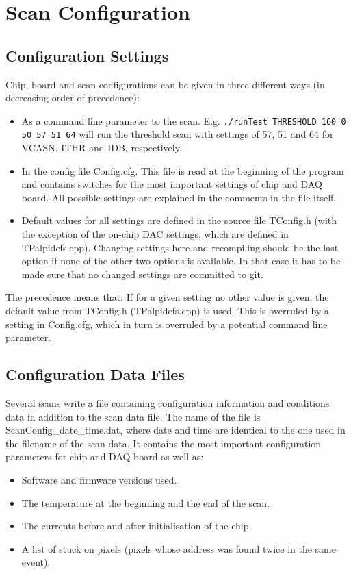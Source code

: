 \documentclass{article}
\let\oldsection\section
\renewcommand\section{\clearpage\oldsection}
\begin{document}
\section{Scan Configuration}

\subsection{Configuration Settings}

Chip, board and scan configurations can be given in three different ways (in decreasing order of precedence): 

\begin{itemize}
\item As a command line parameter to the scan. E.g. \texttt{./runTest THRESHOLD 160 0 50 57 51 64} will run the threshold scan with settings of 57, 51 and 64 for VCASN, ITHR and IDB, respectively.
\item In the config file Config.cfg. This file is read at the beginning of the program and contains switches for the most important settings of chip and DAQ board. All possible settings are explained in the comments in the file itself.
\item Default values for all settings are defined in the source file TConfig.h (with the exception of the on-chip DAC settings, which are defined in TPalpidefs.cpp). Changing settings here and recompiling should be the last option if none of the other two options is available. In that case it has to be made sure that no changed settings are committed to git.
\end{itemize}

The precedence means that: If for a given setting no other value is given, the default value from TConfig.h (TPalpidefs.cpp) is used. This is overruled by a setting in Config.cfg, which in turn is overruled by a potential command line parameter.

\subsection{Configuration Data Files}
Several scans write a file containing configuration information and conditions data in addition to the scan data file. The name of the file is ScanConfig\_date\_time.dat, where date and time are identical to the one used in the filename of the scan data. It contains the most important configuration parameters for chip and DAQ board as well as:

\begin{itemize}
\item Software and firmware versions used.
\item The temperature at the beginning and the end of the scan.
\item The currents before and after initialisation of the chip.
\item A list of stuck on pixels (pixels whose address was found twice in the same event).
\end{itemize}
\end{document}
